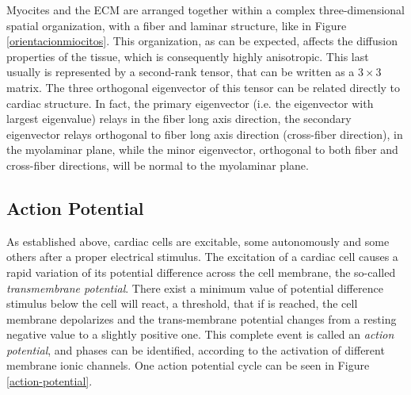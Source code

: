 Myocites and the ECM are arranged together within a complex three-dimensional spatial organization, with a fiber and laminar structure, like in Figure \ref{orientacionmiocitos}. This organization, as can be expected, affects the diffusion properties of the tissue, which is consequently highly anisotropic. This last usually is represented by a second-rank tensor, that can be written as a $3 \times 3$ matrix. The three orthogonal eigenvector of this tensor can be related directly to cardiac structure. In fact, the primary eigenvector (i.e. the eigenvector with largest eigenvalue) relays in the fiber long axis direction, the secondary eigenvector relays orthogonal to fiber long axis direction (cross-fiber direction), in the myolaminar plane, while the minor eigenvector, orthogonal to both fiber and cross-fiber directions, will be normal to the myolaminar plane.

\subsection{Action Potential} 

As established above, cardiac cells are excitable, some autonomously and some others after a proper electrical stimulus. The excitation of a cardiac cell causes a rapid variation of its potential difference across the cell membrane, the so-called \textsl{transmembrane potential}. There exist a minimum value of potential difference stimulus below the cell will react, a threshold, that if is reached, the cell membrane depolarizes and the trans-membrane potential changes from a resting negative value to a slightly positive one. This complete event is called an \textsl{action potential}, and phases can be identified, according to the activation of different membrane ionic channels. One action potential cycle can be seen in Figure \ref{action-potential}. 

